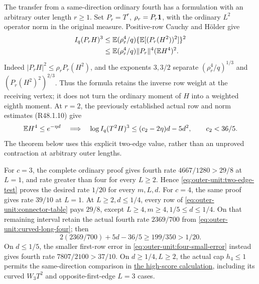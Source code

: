 The transfer from a same-direction ordinary fourth
has a formulation with an arbitrary outer length \(r\ge1\).
Set \(P_r=T^r\), \(\rho_r=P_r\mathbf1\), with the ordinary \(L^2\)
operator norm in the original measure. Positive-row Cauchy and
H\"older give
\begin{equation}\label{eq:outer-unit:outer-transfer}
\begin{aligned}
 I_q(P_rH)^3
 &\le \mathbb E(\rho_r^4/q)\{\mathbb E[(P_r(H^2))^2]\}^2\\
 &\le \mathbb E(\rho_r^4/q)\|P_r\|^4(\mathbb E H^4)^2.
\end{aligned}
\end{equation}
Indeed \(|P_rH|^2\le\rho_rP_r(H^2)\), and the exponents \(3,3/2\)
separate \((\rho_r^4/q)^{1/3}\) and
\((P_r(H^2)^2)^{2/3}\). Thus the formula retains the inverse row
weight at the receiving vertex; it does not turn the ordinary moment
of \(H\) into a weighted eighth moment.
At \(r=2\), the previously established actual row and norm estimates
(R48.1.10) give
\begin{equation}\label{eq:outer-unit:two-edge-test}
 \mathbb E H^4\le e^{-\eta d}\quad\Longrightarrow\quad
 \log I_q(T^2H)^3\le(c_2-2\eta)d-5d^2,
 \qquad c_2<36/5.
\end{equation}
The theorem below uses this explicit two-edge value, rather than an
unproved contraction at arbitrary outer lengths.

For \(c=3\), the complete ordinary proof gives fourth rate
\(4667/1280>29/8\) at \(L=1\), and rate greater than four for
every \(L\ge2\). Hence \eqref{eq:outer-unit:two-edge-test} proves
the desired rate \(1/20\) for every \(m,L,d\).
For \(c=4\), the same proof gives rate \(39/10\) at \(L=1\).
At \(L\ge2,d\le1/4\), every row of
\eqref{eq:outer-unit:connector-table} pays \(29/8\), except
\(L\ge4,m\ge4,1/5\le d\le1/4\).
On that remaining interval retain the actual fourth rate
\(2369/700\) from \eqref{eq:outer-unit:curved-long-four}; then
\[
 2(2369/700)+5d-36/5\ge199/350>1/20.
\]
On \(d\le1/5\), the smaller first-row error in
\eqref{eq:outer-unit:four-small-error} instead gives fourth rate
\(7807/2100>37/10\). On \(d\ge1/4,L\ge2\), the actual cap
\(h_4\le1\) permits the same-direction comparison in
\hyperref[part:R48.4.4]{the high-score calculation}, including its
curved \(W_3T^2\) and opposite-first-edge \(L=3\) cases.

